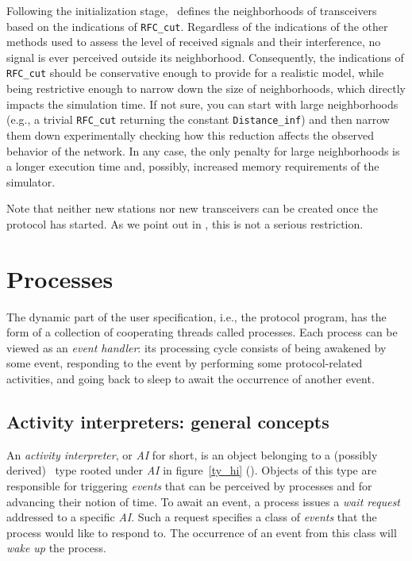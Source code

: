 Following the initialization stage, \smurph\ defines the neighborhoods of
transceivers based on the indications of {\tt RFC\_cut}.
Regardless of the indications of the other methods used to assess the level
of received signals and their interference, no signal is ever perceived
outside its neighborhood.
Consequently, the indications of {\tt RFC\_cut} should be conservative enough
to provide for a realistic model, while being restrictive enough to narrow
down the size of neighborhoods, which directly impacts the simulation time.
If not sure, you can start with large neighborhoods (e.g., a trivial
{\tt RFC\_cut} returning the constant {\tt Distance\_inf})
and then narrow them down experimentally checking how this reduction
affects the observed behavior of the network.
In any case, the only penalty for large neighborhoods is a longer
execution time and, possibly, increased memory requirements of the
simulator.

Note that neither new stations nor new transceivers can be created once the
protocol has started.
As we point out in , this is not a serious restriction.
\section{Processes}
\label{rm_pr}

The dynamic part of the user specification, i.e., the protocol program,
has the form of a collection of cooperating threads called processes.
Each process can be viewed as an {\em event handler\/}:
its processing cycle consists of being
awakened by some event, responding to the event
by performing some protocol-related activities,
and going back to sleep to await the occurrence of another event.

\subsection{Activity interpreters: general concepts}
\label{rm_pr_ai}

An {\em activity interpreter}, or {\em AI\/} for short, is an object
belonging to a (possibly derived) \smurph\ type rooted under {\em AI\/}
in figure~\ref{ty_hi} ().
Objects of this type are responsible for triggering {\em events\/} that can
be perceived by processes and for advancing their notion of time.
To await an event, a process issues a
{\em wait request\/} addressed to a specific {\em AI}.
Such a request specifies a class of {\em events\/}
that the process would like to respond to.
The occurrence of an event from this class will {\em wake up\/} the process.

